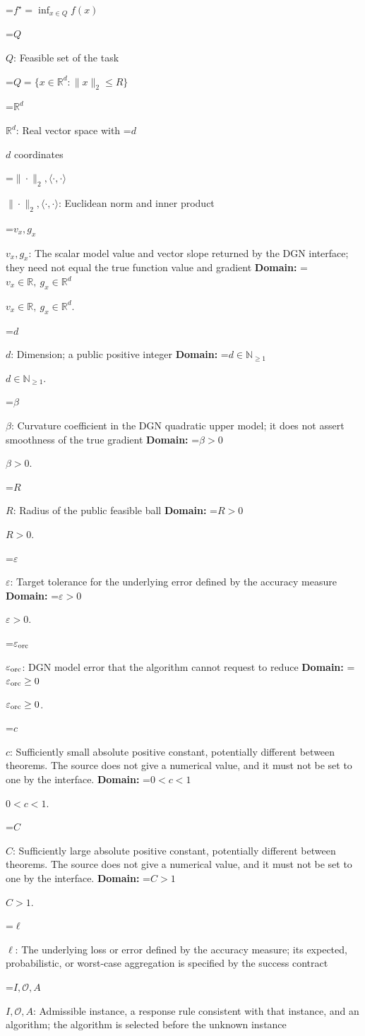 \documentclass[10pt,a4paper]{article}
\newcommand{\AtlasMath}[1]{\par\begingroup\centering\setbox0=\hbox{$\displaystyle #1$}\ifdim\wd0>1.4\linewidth\typeout{ATLAS WIDE FORMULA: \the\wd0}\fi\ifdim\wd0>\linewidth\resizebox{\linewidth}{!}{\box0}\else\box0\fi\par\endgroup}
\newcommand{\AtlasInlineMath}[1]{\begingroup\setbox0=\hbox{$#1$}\ifdim\wd0>.4\linewidth\endgroup\AtlasMath{#1}\else\endgroup$#1$\fi}
\begin{document}
\AtlasMath{f^\star=\inf_{x\in Q}f(x)}


\AtlasInlineMath{Q}: Feasible set of the task


\AtlasMath{Q=\{x\in\mathbb{R}^d:\|x\|_2\le R\}}


\AtlasInlineMath{\mathbb{R}^d}: Real vector space with \AtlasInlineMath{d} coordinates

\AtlasInlineMath{\|\cdot\|_2,\langle\cdot,\cdot\rangle}: Euclidean norm and inner product

\AtlasInlineMath{v_x,g_x}: The scalar model value and vector slope returned by the DGN interface; they need not equal the true function value and gradient \textbf{Domain:} \AtlasInlineMath{v_x\in\mathbb{R},\ g_x\in\mathbb{R}^d}.

\AtlasInlineMath{d}: Dimension; a public positive integer \textbf{Domain:} \AtlasInlineMath{d\in\mathbb{N}_{\ge1}}.

\AtlasInlineMath{\beta}: Curvature coefficient in the DGN quadratic upper model; it does not assert smoothness of the true gradient \textbf{Domain:} \AtlasInlineMath{\beta>0}.

\AtlasInlineMath{R}: Radius of the public feasible ball \textbf{Domain:} \AtlasInlineMath{R>0}.

\AtlasInlineMath{\varepsilon}: Target tolerance for the underlying error defined by the accuracy measure \textbf{Domain:} \AtlasInlineMath{\varepsilon>0}.

\AtlasInlineMath{\varepsilon_{\rm orc}}: DGN model error that the algorithm cannot request to reduce \textbf{Domain:} \AtlasInlineMath{\varepsilon_{\rm orc}\ge0}.

\AtlasInlineMath{c}: Sufficiently small absolute positive constant, potentially different between theorems. The source does not give a numerical value, and it must not be set to one by the interface. \textbf{Domain:} \AtlasInlineMath{0<c<1}.

\AtlasInlineMath{C}: Sufficiently large absolute positive constant, potentially different between theorems. The source does not give a numerical value, and it must not be set to one by the interface. \textbf{Domain:} \AtlasInlineMath{C>1}.

\AtlasInlineMath{\ell}: The underlying loss or error defined by the accuracy measure; its expected, probabilistic, or worst-case aggregation is specified by the success contract

\AtlasInlineMath{I,\mathcal{O},A}: Admissible instance, a response rule consistent with that instance, and an algorithm; the algorithm is selected before the unknown instance
\end{document}
